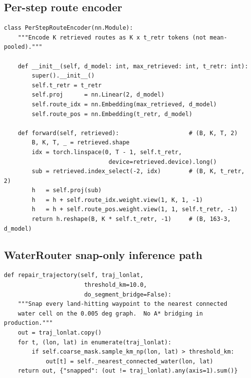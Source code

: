 \documentclass[11pt,a4paper]{article}
\begin{document}
\subsection{Per-step route encoder}

\begin{lstlisting}[caption={Per-step retrieval encoder used inside
                            \texttt{TrajectoryGeneratorV10}.},
                    label={lst:perstep}]
class PerStepRouteEncoder(nn.Module):
    """Encode K retrieved routes as K x t_retr tokens (not mean-pooled)."""

    def __init__(self, d_model: int, max_retrieved: int, t_retr: int):
        super().__init__()
        self.t_retr = t_retr
        self.proj      = nn.Linear(2, d_model)
        self.route_idx = nn.Embedding(max_retrieved, d_model)
        self.route_pos = nn.Embedding(t_retr, d_model)

    def forward(self, retrieved):                    # (B, K, T, 2)
        B, K, T, _ = retrieved.shape
        idx = torch.linspace(0, T - 1, self.t_retr,
                              device=retrieved.device).long()
        sub = retrieved.index_select(-2, idx)        # (B, K, t_retr, 2)
        h   = self.proj(sub)
        h   = h + self.route_idx.weight.view(1, K, 1, -1)
        h   = h + self.route_pos.weight.view(1, 1, self.t_retr, -1)
        return h.reshape(B, K * self.t_retr, -1)     # (B, 163-3, d_model)
\end{lstlisting}

\subsection{WaterRouter snap-only inference path}

\begin{lstlisting}[caption={The production \texttt{WaterRouter} snap-only
                            mode (simplified excerpt).},
                    label={lst:router}]
def repair_trajectory(self, traj_lonlat,
                       threshold_km=10.0,
                       do_segment_bridge=False):
    """Snap every land-hitting waypoint to the nearest connected
    water cell on the 0.005 deg graph.  No A* bridging in production."""
    out = traj_lonlat.copy()
    for t, (lon, lat) in enumerate(traj_lonlat):
        if self.coarse_mask.sample_km_np(lon, lat) > threshold_km:
            out[t] = self._nearest_connected_water(lon, lat)
    return out, {"snapped": (out != traj_lonlat).any(axis=1).sum()}
\end{lstlisting}
\end{document}
